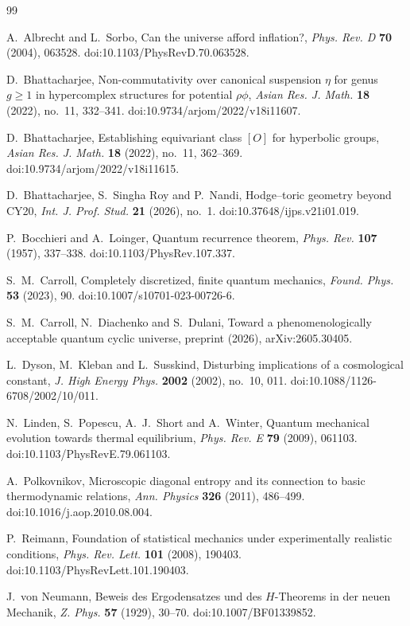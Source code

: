 \documentclass[11pt]{amsart}
\theoremstyle{definition}
\begin{document}
\begin{thebibliography}{99}

 A.~Albrecht and L.~Sorbo, Can the universe afford inflation?, \emph{Phys. Rev. D} \textbf{70} (2004), 063528. doi:10.1103/PhysRevD.70.063528.

 D.~Bhattacharjee, Non-commutativity over canonical suspension $\eta$ for genus $g\ge1$ in hypercomplex structures for potential $\rho\phi$, \emph{Asian Res. J. Math.} \textbf{18} (2022), no.~11, 332--341. doi:10.9734/arjom/2022/v18i11607.

 D.~Bhattacharjee, Establishing equivariant class $[O]$ for hyperbolic groups, \emph{Asian Res. J. Math.} \textbf{18} (2022), no.~11, 362--369. doi:10.9734/arjom/2022/v18i11615.

 D.~Bhattacharjee, S.~Singha Roy and P.~Nandi, Hodge--toric geometry beyond CY20, \emph{Int. J. Prof. Stud.} \textbf{21} (2026), no.~1. doi:10.37648/ijps.v21i01.019.

 P.~Bocchieri and A.~Loinger, Quantum recurrence theorem, \emph{Phys. Rev.} \textbf{107} (1957), 337--338. doi:10.1103/PhysRev.107.337.

 S.~M.~Carroll, Completely discretized, finite quantum mechanics, \emph{Found. Phys.} \textbf{53} (2023), 90. doi:10.1007/s10701-023-00726-6.

 S.~M.~Carroll, N.~Diachenko and S.~Dulani, Toward a phenomenologically acceptable quantum cyclic universe, preprint (2026), arXiv:2605.30405.

 L.~Dyson, M.~Kleban and L.~Susskind, Disturbing implications of a cosmological constant, \emph{J. High Energy Phys.} \textbf{2002} (2002), no.~10, 011. doi:10.1088/1126-6708/2002/10/011.

 N.~Linden, S.~Popescu, A.~J.~Short and A.~Winter, Quantum mechanical evolution towards thermal equilibrium, \emph{Phys. Rev. E} \textbf{79} (2009), 061103. doi:10.1103/PhysRevE.79.061103.

 A.~Polkovnikov, Microscopic diagonal entropy and its connection to basic thermodynamic relations, \emph{Ann. Physics} \textbf{326} (2011), 486--499. doi:10.1016/j.aop.2010.08.004.

 P.~Reimann, Foundation of statistical mechanics under experimentally realistic conditions, \emph{Phys. Rev. Lett.} \textbf{101} (2008), 190403. doi:10.1103/PhysRevLett.101.190403.

 J.~von Neumann, Beweis des Ergodensatzes und des $H$-Theorems in der neuen Mechanik, \emph{Z. Phys.} \textbf{57} (1929), 30--70. doi:10.1007/BF01339852.

\end{thebibliography}
\end{document}
